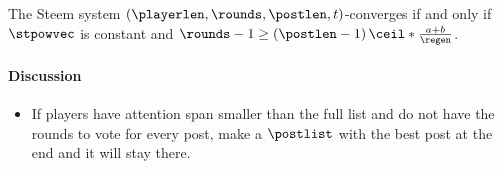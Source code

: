 \begin{theorem}
  The Steem system $\left(\playerlen, \rounds, \postlen, t\right)$-converges if
  and only if $\stpowvec$ is constant and $\rounds - 1 \geq \left(\postlen -
  1\right) \ceil*{\frac{a + b}{\regen}}$.
\end{theorem}

  \paragraph{Discussion}
    \begin{itemize}
      \item If players have attention span smaller than the full list and do not
      have the rounds to vote for every post, make a $\postlist$ with the best
      post at the end and it will stay there.
    \end{itemize}
